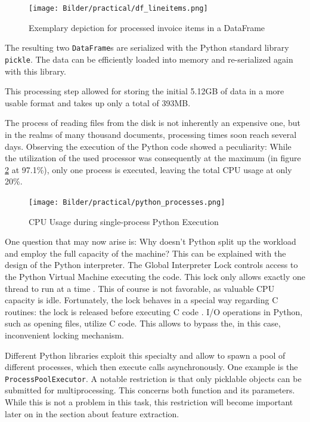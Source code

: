 	\begin{figure}[ht]
		\centering
		\texttt{[image: Bilder/practical/df\_lineitems.png]}
		\caption{Exemplary depiction for processed invoice items in a DataFrame}
		\label{fig:df-invoice}
	\end{figure}
	
	The resulting two \lstinline|DataFrame|s are serialized with the Python standard library \lstinline|pickle|. The data can be efficiently loaded into memory and re-serialized again with this library.
	
	This processing step allowed for storing the initial 5.12GB of data in a more usable format and takes up only a total of 393MB.

	The process of reading files from the disk is not inherently an expensive one, but in the realms of many thousand documents, processing times soon reach several days. Observing the execution of the Python code showed a peculiarity: While the utilization of the used processor was consequently at the maximum (in figure \ref{fig:cpu} at 97.1\%), only one process is executed, leaving the total \ac{CPU} usage at only 20\%. 
	
	\begin{figure}[ht]
		\centering
		\texttt{[image: Bilder/practical/python\_processes.png]}
		\caption{\ac{CPU} Usage during single-process Python Execution}
		\label{fig:cpu}
	\end{figure}
	
	
	One question that may now arise is: Why doesn't Python split up the workload and employ the full capacity of the machine?
	This can be explained with the design of the Python interpreter. The Global Interpreter Lock controls access to the Python Virtual Machine executing the code. This lock only allows exactly one thread to run at a time \cite{corePython}. This of course is not favorable, as valuable CPU capacity is idle. Fortunately, the lock behaves in a special way regarding C routines: the lock is released before executing C code \cite{corePython}. I/O operations in Python, such as opening files, utilize C code. This allows to bypass the, in this case, inconvenient locking mechanism. 
	
	Different Python libraries exploit this specialty and allow to spawn a pool of different processes, which then execute calls asynchronously. One example is the \lstinline|ProcessPoolExecutor|. A notable restriction is that only picklable objects can be submitted for multiprocessing. This concerns both function and its parameters. While this is not a problem in this task, this restriction will become important later on in the section about feature extraction.
	
